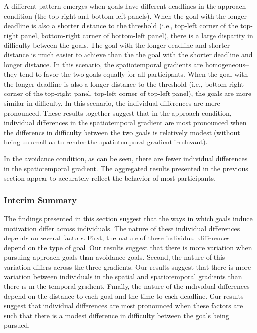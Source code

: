 \documentclass[a4paper,doc,natbib,donotrepeattitle]{apa6}
\begin{document}
A different pattern emerges when goals have different deadlines in the approach condition (the top-right and bottom-left panels). When the goal with the longer deadline is also a shorter distance to the threshold (i.e., top-left corner of the top-right panel, bottom-right corner of bottom-left panel), there is a large disparity in difficulty between the goals. The goal with the longer deadline and shorter distance is much easier to achieve than the the goal with the shorter deadline and longer distance. In this scenario, the spatiotemporal gradients are homogeneous--they tend to favor the two goals equally for all participants. When the goal with the longer deadline is also a longer distance to the threshold (i.e., bottom-right corner of the top-right panel, top-left corner of top-left panel), the goals are more similar in difficulty. In this scenario, the individual differences are more pronounced. These results together suggest that in the approach condition, individual differences in the spatiotemporal gradient are most pronounced when the difference in difficulty between the two goals is relatively modest (without being so small as to render the spatiotemporal gradient irrelevant).

In the avoidance condition, as can be seen, there are fewer individual differences in the spatiotemporal gradient. The aggregated results presented in the previous section appear to accurately reflect the behavior of most participants.

\subsubsection{Interim Summary}

The findings presented in this section suggest that the ways in which goals induce motivation differ across individuals. The nature of these individual differences depends on several factors. First, the nature of these individual differences depend on the type of goal. Our results suggest that there is more variation when pursuing approach goals than avoidance goals. Second, the nature of this variation differs across the three gradients. Our results suggest that there is more variation between individuals in the spatial and spatiotemporal gradients than there is in the temporal gradient. Finally, the nature of the individual differences depend on the distance to each goal and the time to each deadline. Our results suggest that individual differences are most pronounced when these factors are such that there is a modest difference in difficulty between the goals being pursued.
\end{document}

